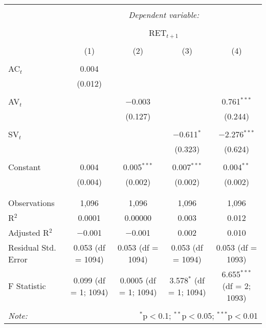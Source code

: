 
\begin{table}[!htbp] \centering 
  \caption{} 
  \label{} 
\begin{tabular}{@{\extracolsep{5pt}}lcccc} 
\\[-1.8ex]\hline 
\hline \\[-1.8ex] 
 & \multicolumn{4}{c}{\textit{Dependent variable:}} \\ 
\cline{2-5} 
\\[-1.8ex] & \multicolumn{4}{c}{RET$_{t+1}$} \\ 
\\[-1.8ex] & (1) & (2) & (3) & (4)\\ 
\hline \\[-1.8ex] 
 AC$_{t}$ & 0.004 &  &  &  \\ 
  & (0.012) &  &  &  \\ 
  & & & & \\ 
 AV$_{t}$ &  & $-$0.003 &  & 0.761$^{***}$ \\ 
  &  & (0.127) &  & (0.244) \\ 
  & & & & \\ 
 SV$_{t}$ &  &  & $-$0.611$^{*}$ & $-$2.276$^{***}$ \\ 
  &  &  & (0.323) & (0.624) \\ 
  & & & & \\ 
 Constant & 0.004 & 0.005$^{***}$ & 0.007$^{***}$ & 0.004$^{**}$ \\ 
  & (0.004) & (0.002) & (0.002) & (0.002) \\ 
  & & & & \\ 
\hline \\[-1.8ex] 
Observations & 1,096 & 1,096 & 1,096 & 1,096 \\ 
R$^{2}$ & 0.0001 & 0.00000 & 0.003 & 0.012 \\ 
Adjusted R$^{2}$ & $-$0.001 & $-$0.001 & 0.002 & 0.010 \\ 
Residual Std. Error & 0.053 (df = 1094) & 0.053 (df = 1094) & 0.053 (df = 1094) & 0.053 (df = 1093) \\ 
F Statistic & 0.099 (df = 1; 1094) & 0.0005 (df = 1; 1094) & 3.578$^{*}$ (df = 1; 1094) & 6.655$^{***}$ (df = 2; 1093) \\ 
\hline 
\hline \\[-1.8ex] 
\textit{Note:}  & \multicolumn{4}{r}{$^{*}$p$<$0.1; $^{**}$p$<$0.05; $^{***}$p$<$0.01} \\ 
\end{tabular} 
\end{table} 
